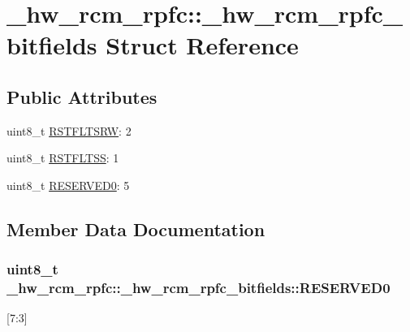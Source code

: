 \hypertarget{struct__hw__rcm__rpfc_1_1__hw__rcm__rpfc__bitfields}{}\section{\+\_\+hw\+\_\+rcm\+\_\+rpfc\+:\+:\+\_\+hw\+\_\+rcm\+\_\+rpfc\+\_\+bitfields Struct Reference}
\label{struct__hw__rcm__rpfc_1_1__hw__rcm__rpfc__bitfields}
\subsection*{Public Attributes}
\begin{DoxyCompactItemize}
\item 
uint8\+\_\+t \hyperlink{struct__hw__rcm__rpfc_1_1__hw__rcm__rpfc__bitfields_a3572a49431d60f650936690bc42cc8e0}{R\+S\+T\+F\+L\+T\+S\+RW}\+: 2
\item 
uint8\+\_\+t \hyperlink{struct__hw__rcm__rpfc_1_1__hw__rcm__rpfc__bitfields_ae9c6697d22eb6756e7bc29dcb765e156}{R\+S\+T\+F\+L\+T\+SS}\+: 1
\item 
uint8\+\_\+t \hyperlink{struct__hw__rcm__rpfc_1_1__hw__rcm__rpfc__bitfields_ada91173f515b58ff48cbc3ff20047898}{R\+E\+S\+E\+R\+V\+E\+D0}\+: 5
\end{DoxyCompactItemize}


\subsection{Member Data Documentation}
\subsubsection[{\texorpdfstring{R\+E\+S\+E\+R\+V\+E\+D0}{RESERVED0}}]{\setlength{\rightskip}{0pt plus 5cm}uint8\+\_\+t \+\_\+hw\+\_\+rcm\+\_\+rpfc\+::\+\_\+hw\+\_\+rcm\+\_\+rpfc\+\_\+bitfields\+::\+R\+E\+S\+E\+R\+V\+E\+D0}\hypertarget{struct__hw__rcm__rpfc_1_1__hw__rcm__rpfc__bitfields_ada91173f515b58ff48cbc3ff20047898}{}\label{struct__hw__rcm__rpfc_1_1__hw__rcm__rpfc__bitfields_ada91173f515b58ff48cbc3ff20047898}
\mbox{[}7\+:3\mbox{]} 
